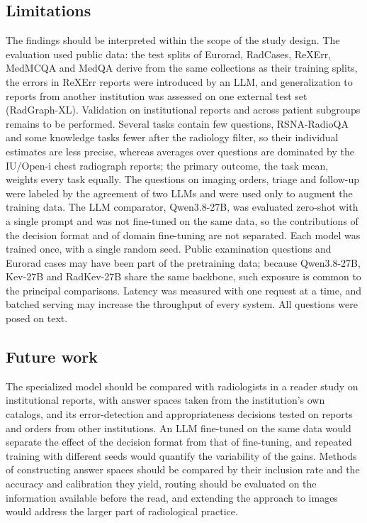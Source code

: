 \subsection{Limitations}\label{sec:limitations}

The findings should be interpreted within the scope of the study design. The evaluation used public data: the test splits of Eurorad, RadCases, ReXErr, MedMCQA and MedQA derive from the same collections as their training splits, the errors in ReXErr reports were introduced by an LLM, and generalization to reports from another institution was assessed on one external test set (RadGraph-XL). Validation on institutional reports and across patient subgroups remains to be performed. Several tasks contain few questions, RSNA-RadioQA  and some knowledge tasks fewer after the radiology filter, so their individual estimates are less precise, whereas averages over questions are dominated by the IU/Open-i chest radiograph reports; the primary outcome, the task mean, weights every task equally. The questions on imaging orders, triage and follow-up were labeled by the agreement of two LLMs and were used only to augment the training data. The LLM comparator, Qwen3.8-27B, was evaluated zero-shot with a single prompt and was not fine-tuned on the same data, so the contributions of the decision format and of domain fine-tuning are not separated. Each model was trained once, with a single random seed. Public examination questions and Eurorad cases may have been part of the pretraining data; because Qwen3.8-27B, Kev-27B and RadKev-27B share the same backbone, such exposure is common to the principal comparisons. Latency was measured with one request at a time, and batched serving may increase the throughput of every system. All questions were posed on text.

\subsection{Future work}\label{sec:future}

The specialized model should be compared with radiologists in a reader study on institutional reports, with answer spaces taken from the institution's own catalogs, and its error-detection and appropriateness decisions tested on reports and orders from other institutions. An LLM fine-tuned on the same data would separate the effect of the decision format from that of fine-tuning, and repeated training with different seeds would quantify the variability of the gains. Methods of constructing answer spaces should be compared by their inclusion rate and the accuracy and calibration they yield, routing should be evaluated on the information available before the read, and extending the approach to images would address the larger part of radiological practice.
